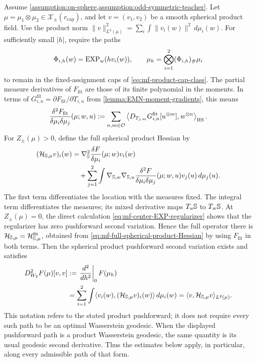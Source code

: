 \begin{lemma}
\label{lem:mf-full-spherical-Hessian}
Assume \cref{assumption:on-sphere,assumption:odd-symmetric-teacher}.
Let $\mu=\mu_1\otimes\mu_2\in\mathcal X_\pm(r_{\mathrm{cap}})$, and let
$v=(v_1,v_2)$ be a smooth spherical product field. Use the product norm
$\|v\|_{L^2(\mu)}^2=\sum_i\int\|v_i(w)\|^2\,d\mu_i(w)$.
For sufficiently small $|h|$, require the paths
\[
 \Phi_{i,h}(w)=\mathrm{EXP}_w(hv_i(w)),\qquad
 \mu_h=\bigotimes_{i=1}^2(\Phi_{i,h})_\#\mu_i
\]
to remain in the fixed-assignment caps of \eqref{eq:mf-product-cap-class}.
The partial measure derivatives of $F_{\mathrm{fit}}$ are those of
its finite polynomial in the moments. In terms of
$G_{i,n}^{\mathrm{fit}}=\partial F_{\mathrm{fit}}/\partial T_{i,n}$
from \cref{lemma:EMN-moment-gradients}, this means
\begin{equation}
\label{eq:mf-fitting-second-measure-variation}
 \frac{\delta^2F_{\mathrm{fit}}}{\delta\mu_i\delta\mu_j}(\mu;w,u)
 :=\sum_{n,m\in\mathcal O}
 \left\langle
 D_{T_{j,m}}G_{i,n}^{\mathrm{fit}}[u^{\otimes m}],
 w^{\otimes n}\right\rangle_{\rm HS}.
\end{equation}
For $Z_\pm(\mu)>0$, define the full spherical product Hessian by
\begin{equation}
\label{eq:mf-full-spherical-product-Hessian}
\begin{aligned}
 (\mathcal H_{\mathbb{S},\mu}v)_i(w)
 &=\nabla_{\mathbb{S}}^2\frac{\delta F}{\delta\mu_i}(\mu;w)v_i(w)\\
 &\quad+\sum_{j=1}^2\int
 \nabla_{\mathbb{S},w}\nabla_{\mathbb{S},u}
 \frac{\delta^2F}{\delta\mu_i\delta\mu_j}(\mu;w,u)
                  v_j(u)\,d\mu_j(u).
\end{aligned}
\end{equation}
The first term differentiates the location with the measures fixed.
The integral term differentiates the measures; its mixed derivative maps
$T_u\mathbb{S}$ to $T_w\mathbb{S}$. At $Z_\pm(\mu)=0$, the direct calculation
\cref{eq:mf-center-EXP-regularizer} shows that the regularizer has zero
pushforward second variation. Hence the full operator there is
$\mathcal H_{\mathbb{S},\mu}=\mathcal H_{\mathbb{S},\mu}^{\mathrm{fit}}$, obtained
from \cref{eq:mf-full-spherical-product-Hessian} by using
$F_{\mathrm{fit}}$ in both terms.
Then the spherical product pushforward second variation exists and satisfies
\begin{equation}
\label{eq:mf-full-Hessian-second-variation}
\begin{aligned}
 D^2_{W_2}F(\mu)[v,v]
 &:=\left.\frac{d^2}{dh^2}\right|_0 F(\mu_h)\\
 &=\sum_{i=1}^2\int
       \langle v_i(w),(\mathcal H_{\mathbb{S},\mu}v)_i(w)\rangle\,d\mu_i(w)
 =\langle v,\mathcal H_{\mathbb{S},\mu}v\rangle_{L^2(\mu)}.
\end{aligned}
\end{equation}
This notation refers to the stated product pushforward; it does not
require every such path to be an optimal Wasserstein geodesic. When the
displayed pushforward path is a product Wasserstein geodesic, the same quantity
is its usual geodesic second derivative. Thus the estimates below apply, in
particular, along every admissible path of that form.
\end{lemma}
